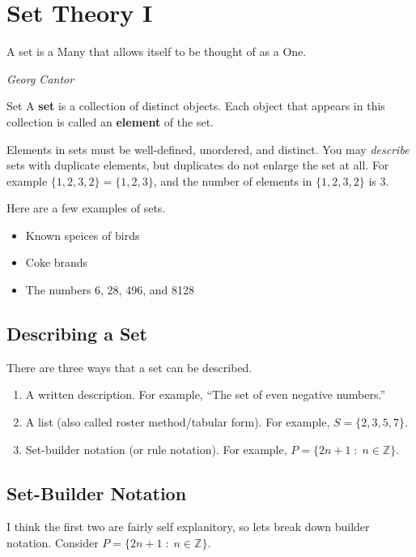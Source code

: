 \chapter{Set Theory I}

\epigraph{A set is a Many that allows itself to be thought of as a One.}{\emph{Georg Cantor}}

\begin{boxdefine}{Set}{}
	A {\bf set} is a collection of distinct objects. Each object that appears in this collection is called an {\bf element} of the set.
\end{boxdefine}

Elements in sets must be well-defined, unordered, and distinct. You may \emph{describe} sets with duplicate elements, but duplicates do not enlarge the set at all. For example $\{1,2,3,2\}=\{1,2,3\}$, and the number of elements in $\{1,2,3,2\}$ is 3.

\begin{boxexample}{}{}
	Here are a few examples of sets.

	\begin{itemize}
		\item Known speices of birds
		\item Coke brands
		\item The numbers 6, 28, 496, and 8128
	\end{itemize}
\end{boxexample}

\section{Describing a Set}

There are three ways that a set can be described.

\begin{enumerate}
	\item A written description. For example, ``The set of even negative numbers.''
	\item A list (also called roster method/tabular form). For example, $S = \{2,3,5,7\}$.
	\item Set-builder notation (or rule notation). For example, $P = \{2n+1\;:\;n \in \mathbb{Z}\}$.
\end{enumerate}

\section{Set-Builder Notation}

I think the first two are fairly self explanitory, so lets break down builder notation. Consider $P = \{2n+1\;:\;n \in \mathbb{Z}\}$.

